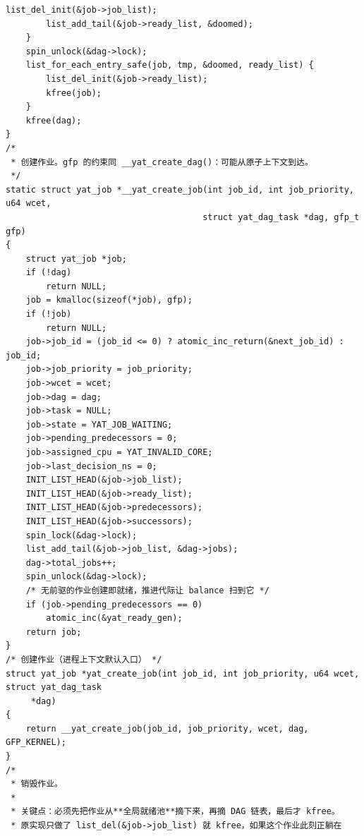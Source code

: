 \documentclass[10pt,a4paper]{article}
\newenvironment{yatpage}{\vspace*{0pt}}{\par}
\begin{document}
\begin{yatpage}
\begin{Verbatim}[fontsize=\fontsize{8.2}{9.8}\selectfont]
        list_del_init(&job->job_list);
        list_add_tail(&job->ready_list, &doomed);
    }
    spin_unlock(&dag->lock);
    list_for_each_entry_safe(job, tmp, &doomed, ready_list) {
        list_del_init(&job->ready_list);
        kfree(job);
    }
    kfree(dag);
}
/*
 * 创建作业。gfp 的约束同 __yat_create_dag()：可能从原子上下文到达。
 */
static struct yat_job *__yat_create_job(int job_id, int job_priority, u64 wcet,
                                       struct yat_dag_task *dag, gfp_t gfp)
{
    struct yat_job *job;
    if (!dag)
        return NULL;
    job = kmalloc(sizeof(*job), gfp);
    if (!job)
        return NULL;
    job->job_id = (job_id <= 0) ? atomic_inc_return(&next_job_id) : job_id;
    job->job_priority = job_priority;
    job->wcet = wcet;
    job->dag = dag;
    job->task = NULL;
    job->state = YAT_JOB_WAITING;
    job->pending_predecessors = 0;
    job->assigned_cpu = YAT_INVALID_CORE;
    job->last_decision_ns = 0;
    INIT_LIST_HEAD(&job->job_list);
    INIT_LIST_HEAD(&job->ready_list);
    INIT_LIST_HEAD(&job->predecessors);
    INIT_LIST_HEAD(&job->successors);
    spin_lock(&dag->lock);
    list_add_tail(&job->job_list, &dag->jobs);
    dag->total_jobs++;
    spin_unlock(&dag->lock);
    /* 无前驱的作业创建即就绪，推进代际让 balance 扫到它 */
    if (job->pending_predecessors == 0)
        atomic_inc(&yat_ready_gen);
    return job;
}
/* 创建作业（进程上下文默认入口） */
struct yat_job *yat_create_job(int job_id, int job_priority, u64 wcet, struct yat_dag_task
     *dag)
{
    return __yat_create_job(job_id, job_priority, wcet, dag, GFP_KERNEL);
}
/*
 * 销毁作业。
 *
 * 关键点：必须先把作业从**全局就绪池**摘下来，再摘 DAG 链表，最后才 kfree。
 * 原实现只做了 list_del(&job->job_list) 就 kfree，如果这个作业此刻正躺在
\end{Verbatim}
\end{yatpage}
\newpage
\end{document}
